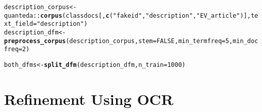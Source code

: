 \documentclass{article}\usepackage[]{graphicx}\usepackage[]{color}
\makeatletter
\newcommand{\hlnum}[1]{\textcolor[rgb]{0.686,0.059,0.569}{#1}}%
\newcommand{\hlstr}[1]{\textcolor[rgb]{0.192,0.494,0.8}{#1}}%
\newcommand{\hlopt}[1]{\textcolor[rgb]{0,0,0}{#1}}%
\newcommand{\hlstd}[1]{\textcolor[rgb]{0.345,0.345,0.345}{#1}}%
\newcommand{\hlkwb}[1]{\textcolor[rgb]{0.69,0.353,0.396}{#1}}%
\newcommand{\hlkwc}[1]{\textcolor[rgb]{0.333,0.667,0.333}{#1}}%
\newcommand{\hlkwd}[1]{\textcolor[rgb]{0.737,0.353,0.396}{\textbf{#1}}}%
\newenvironment{kframe}{%
 \def\at@end@of@kframe{}%
 \ifinner\ifhmode%
  \def\at@end@of@kframe{\end{minipage}}%
  \begin{minipage}{\columnwidth}%
 \fi\fi%
 \def\FrameCommand##1{\hskip\@totalleftmargin \hskip-\fboxsep
 \colorbox{shadecolor}{##1}\hskip-\fboxsep
     \hskip-\linewidth \hskip-\@totalleftmargin \hskip\columnwidth}%
 \MakeFramed {\advance\hsize-\width
   \@totalleftmargin\z@ \linewidth\hsize
   \@setminipage}}%
 {\par\unskip\endMakeFramed%
 \at@end@of@kframe}
\newenvironment{knitrout}{}{} %
\makeatother
\begin{document}
\begin{knitrout}
\begin{kframe}\begin{alltt}
\hlstd{description_corpus}\hlkwb{<-}\hlstd{quanteda}\hlopt{::}\hlkwd{corpus}\hlstd{(classdocs[,}\hlkwd{c}\hlstd{(}\hlstr{"fakeid"}\hlstd{,} \hlstr{"description"}\hlstd{,} \hlstr{"EV_article"}\hlstd{)],} \hlkwc{text_field} \hlstd{=} \hlstr{"description"}\hlstd{)}
\hlstd{description_dfm} \hlkwb{<-} \hlkwd{preprocess_corpus}\hlstd{(description_corpus,} \hlkwc{stem}\hlstd{=}\hlnum{FALSE}\hlstd{,} \hlkwc{min_termfreq}\hlstd{=}\hlnum{5}\hlstd{,} \hlkwc{min_docfreq} \hlstd{=} \hlnum{2}\hlstd{)}

\hlstd{both_dfms}\hlkwb{<-}\hlkwd{split_dfm}\hlstd{(description_dfm,} \hlkwc{n_train} \hlstd{=} \hlnum{1000}\hlstd{)}
\end{alltt}
\end{kframe}
\end{knitrout}

\section{Refinement Using OCR}
\end{document}
